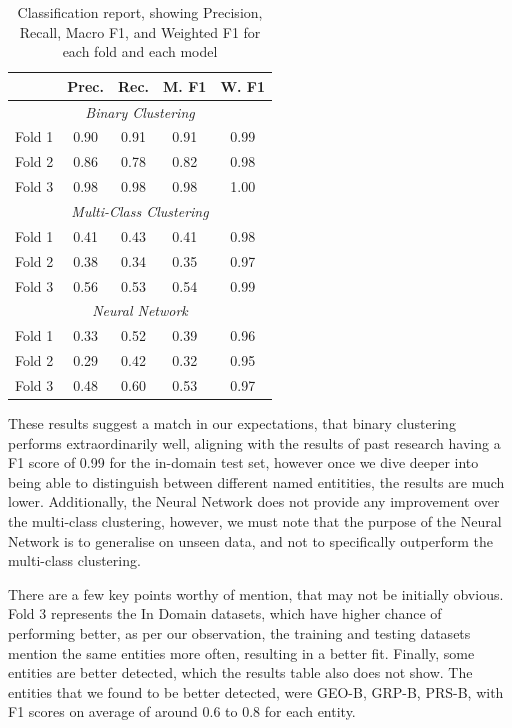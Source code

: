 \documentclass[11pt]{article}
\begin{document}
\begin{table}[H]
  \centering
  \begin{tabular}{|l|c|c|c|c|}
  \hline
  \textbf{} & \textbf{Prec.} & \textbf{Rec.} & \textbf{M. F1} & \textbf{W. F1} \\
  \hline
  \multicolumn{5}{|c|}{\textit{Binary Clustering}} \\
  \hline
  Fold 1   & 0.90 & 0.91 & 0.91 & 0.99 \\
  Fold 2   & 0.86 & 0.78 & 0.82 & 0.98 \\
  Fold 3   & 0.98 & 0.98 & 0.98 & 1.00 \\
  \hline
  \multicolumn{5}{|c|}{\textit{Multi-Class Clustering}} \\
  \hline
  Fold 1   & 0.41 & 0.43 & 0.41 & 0.98 \\
  Fold 2   & 0.38 & 0.34 & 0.35 & 0.97 \\
  Fold 3   & 0.56 & 0.53 & 0.54 & 0.99 \\
  \hline
  \multicolumn{5}{|c|}{\textit{Neural Network}} \\
  \hline
  Fold 1   & 0.33 & 0.52 & 0.39 & 0.96 \\
  Fold 2   & 0.29 & 0.42 & 0.32 & 0.95 \\
  Fold 3   & 0.48 & 0.60 & 0.53 & 0.97 \\
  \hline
  \end{tabular}
  \caption{Classification report, showing Precision, Recall, Macro F1, and Weighted F1 for each fold and each model}
  \label{tab:Classification-Report}
\end{table}

These results suggest a match in our expectations, that binary clustering performs extraordinarily well, aligning with the results of past
research having a F1 score of 0.99 for the in-domain test set, however once we dive deeper
into being able to distinguish between different named entitities, the results are much lower.
Additionally, the Neural Network does not provide any improvement over the multi-class clustering, however,
we must note that the purpose of the Neural Network is to generalise on unseen data, and not to specifically outperform the multi-class clustering.

There are a few key points worthy of mention, that may not be initially obvious.
Fold 3 represents the In Domain datasets, which have higher chance of performing better, as per our observation, the training and testing
datasets mention the same entities more often, resulting in a better fit. Finally, some entities are better detected, which the results table
also does not show. The entities that we found to be better detected, were GEO-B, GRP-B, PRS-B, with F1 scores on average of around 0.6 to 0.8
for each entity.
\end{document}
